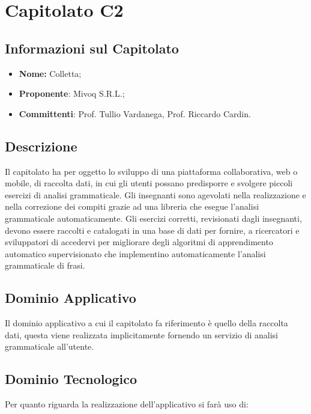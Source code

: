 \section{Capitolato C2}
\subsection{Informazioni sul Capitolato}
\begin{itemize}
	\item \textbf{Nome:} Colletta;
	\item \textbf{Proponente}: Mivoq S.R.L.;
	\item \textbf{Committenti}: Prof. Tullio Vardanega, Prof. Riccardo Cardin.
\end{itemize}

\subsection{Descrizione}
Il capitolato ha per oggetto lo sviluppo di una piattaforma 
collaborativa, web o mobile, 
di raccolta dati, in cui gli utenti possano predisporre e svolgere piccoli esercizi di analisi grammaticale. Gli insegnanti sono agevolati nella realizzazione e nella correzione dei compiti grazie ad una libreria che esegue l’analisi grammaticale automaticamente.
Gli esercizi corretti, revisionati dagli insegnanti, devono essere raccolti e catalogati in una base di dati per fornire, a ricercatori e sviluppatori di accedervi per migliorare degli algoritmi di apprendimento automatico supervisionato che implementino automaticamente l'analisi grammaticale di frasi. 

\subsection{Dominio Applicativo}
Il dominio applicativo a cui il capitolato fa riferimento è quello della raccolta dati, questa viene realizzata implicitamente fornendo un servizio 
di analisi grammaticale all’utente. 

\subsection{Dominio Tecnologico}
Per quanto riguarda la realizzazione dell’applicativo si farà uso di:

